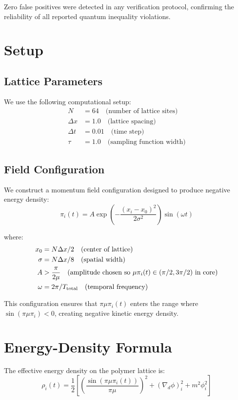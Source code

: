 \documentclass[11pt]{article}
\begin{document}
Zero false positives were detected in any verification protocol, confirming the reliability of all reported quantum inequality violations.

\section{Setup}

\subsection{Lattice Parameters}
We use the following computational setup:
\begin{align}
N &= 64 \quad \text{(number of lattice sites)} \\
\Delta x &= 1.0 \quad \text{(lattice spacing)} \\
\Delta t &= 0.01 \quad \text{(time step)} \\
\tau &= 1.0 \quad \text{(sampling function width)}
\end{align}

\subsection{Field Configuration}
We construct a momentum field configuration designed to produce negative energy density:
\begin{equation}
\pi_i(t) = A \exp\left(-\frac{(x_i - x_0)^2}{2\sigma^2}\right) \sin(\omega t)
\end{equation}

where:
\begin{align}
x_0 &= N\Delta x / 2 \quad \text{(center of lattice)} \\
\sigma &= N\Delta x / 8 \quad \text{(spatial width)} \\
A &> \frac{\pi}{2\mu} \quad \text{(amplitude chosen so } \mu\pi_i(t) \in (\pi/2, 3\pi/2) \text{ in core)} \\
\omega &= 2\pi / T_{\rm total} \quad \text{(temporal frequency)}
\end{align}

This configuration ensures that $\pi\mu\pi_i(t)$ enters the range where $\sin(\pi\mu\pi_i) < 0$, creating negative kinetic energy density.

\section{Energy-Density Formula}

The effective energy density on the polymer lattice is:
\begin{equation}
\rho_i(t) = \frac{1}{2}\left[\left(\frac{\sin(\pi\mu\pi_i(t))}{\pi\mu}\right)^2 + (\nabla_d \phi)_i^2 + m^2\phi_i^2\right]
\end{equation}
\end{document}
